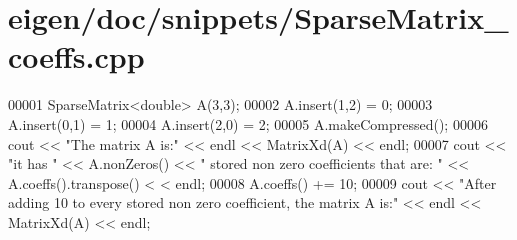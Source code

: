 \hypertarget{eigen_2doc_2snippets_2_sparse_matrix__coeffs_8cpp_source}{}\section{eigen/doc/snippets/\+Sparse\+Matrix\+\_\+coeffs.cpp}
\label{eigen_2doc_2snippets_2_sparse_matrix__coeffs_8cpp_source}

\begin{DoxyCode}
00001 SparseMatrix<double> A(3,3);
00002 A.insert(1,2) = 0;
00003 A.insert(0,1) = 1;
00004 A.insert(2,0) = 2;
00005 A.makeCompressed();
00006 cout << \textcolor{stringliteral}{"The matrix A is:"} << endl << MatrixXd(A) << endl;
00007 cout << \textcolor{stringliteral}{"it has "} << A.nonZeros() << \textcolor{stringliteral}{" stored non zero coefficients that are: "} << A.coeffs().transpose() <
      < endl;
00008 A.coeffs() += 10;
00009 cout << \textcolor{stringliteral}{"After adding 10 to every stored non zero coefficient, the matrix A is:"} << endl << MatrixXd(A) << 
      endl;
\end{DoxyCode}
